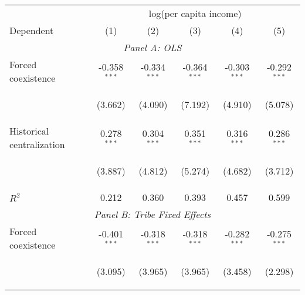 \begin{center}
\begin{tabular}{lccccc}
\hline \noalign{\smallskip} & \multicolumn{5}{c}{log(per capita income)}\\
Dependent & (1) & (2) & (3) & (4) & (5)\\
\hline \multicolumn{6}{c}{\textit{Panel A: OLS}}\\
\noalign{\smallskip}\noalign{\smallskip}Forced coexistence & -0.358$ ^{***}$ & -0.334$ ^{***}$ & -0.364$ ^{***}$ & -0.303$ ^{***}$ & -0.292$ ^{***}$\\
 & \begin{footnotesize}(3.662)\end{footnotesize} & \begin{footnotesize}(4.090)\end{footnotesize} & \begin{footnotesize}(7.192)\end{footnotesize} & \begin{footnotesize}(4.910)\end{footnotesize} & \begin{footnotesize}(5.078)\end{footnotesize}\\
\noalign{\smallskip}Historical centralization & 0.278$ ^{***}$ & 0.304$ ^{***}$ & 0.351$ ^{***}$ & 0.316$ ^{***}$ & 0.286$ ^{***}$\\
 & \begin{footnotesize}(3.887)\end{footnotesize} & \begin{footnotesize}(4.812)\end{footnotesize} & \begin{footnotesize}(5.274)\end{footnotesize} & \begin{footnotesize}(4.682)\end{footnotesize} & \begin{footnotesize}(3.712)\end{footnotesize}\\
\noalign{\smallskip}$ R^2$ & 0.212 & 0.360 & 0.393 & 0.457 & 0.599\\
\multicolumn{6}{c}{\textit{Panel B: Tribe Fixed Effects}}\\
\noalign{\smallskip}Forced coexistence & -0.401$ ^{***}$ & -0.318$ ^{***}$ & -0.318$ ^{***}$ & -0.282$ ^{***}$ & -0.275$ ^{***}$\\
 & \begin{footnotesize}(3.095)\end{footnotesize} & \begin{footnotesize}(3.965)\end{footnotesize} & \begin{footnotesize}(3.965)\end{footnotesize} & \begin{footnotesize}(3.458)\end{footnotesize} & \begin{footnotesize}(2.298)\end{footnotesize}\\

\end{tabular}
\end{center}
